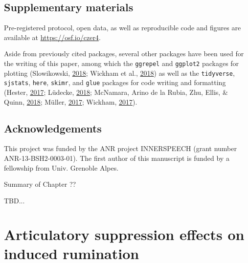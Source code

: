 \documentclass[a4paper,12pt,twoside,openright,oldfontcommands,final]{memoir}
\newcommand\getcurrentref[1]{
 \ifnumequal{\value{#1}}{0}
  {??}
  {\the\value{#1}}
}
\begin{document}
\hypertarget{suppCh5}{%
\section{Supplementary materials}\label{suppCh5}}

Pre-registered protocol, open data, as well as reproducible code and figures are available at \url{https://osf.io/czer4}.

Aside from previously cited packages, several other packages have been used for the writing of this paper, among which the \texttt{ggrepel} and \texttt{ggplot2} packages for plotting (Slowikowski, \protect\hyperlink{ref-R-ggrepel}{2018}; Wickham et al., \protect\hyperlink{ref-R-ggplot2}{2018}) as well as the \texttt{tidyverse}, \texttt{sjstats}, \texttt{here}, \texttt{skimr}, and \texttt{glue} packages for code writing and formatting (Hester, \protect\hyperlink{ref-R-glue}{2017}; Lüdecke, \protect\hyperlink{ref-R-sjstats}{2018}; McNamara, Arino de la Rubia, Zhu, Ellis, \& Quinn, \protect\hyperlink{ref-R-skimr}{2018}; Müller, \protect\hyperlink{ref-R-here}{2017}; Wickham, \protect\hyperlink{ref-R-tidyverse}{2017}).

\hypertarget{acknowledgements-2}{%
\section{Acknowledgements}\label{acknowledgements-2}}

This project was funded by the ANR project INNERSPEECH (grant number ANR-13-BSH2-0003-01). The first author of this manuscript is funded by a fellowship from Univ. Grenoble Alpes.

\newpage

\begin{vplace}[1]

\begin{summary}{Summary of Chapter\getcurrentref{chapter}}

TBD...

\end{summary}

\end{vplace}

\hypertarget{chap6}{%
\chapter{Articulatory suppression effects on induced rumination}\label{chap6}}
\end{document}
